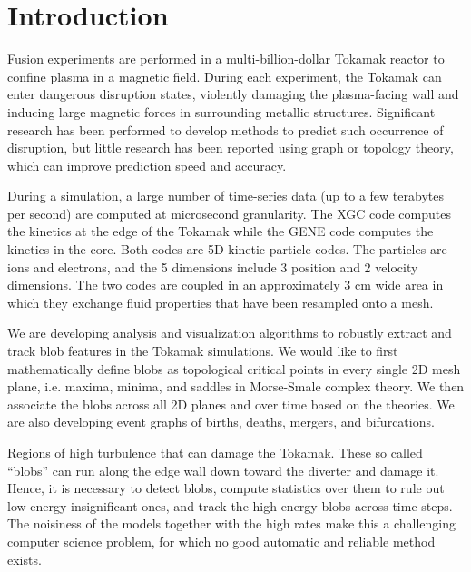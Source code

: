 \newcommand{\cA}{\mathcal{A}} %
\newcommand{\R}{\mathbb{R}} %
\newcommand{\cD}{\mathcal{D}} %
\newcommand{\cC}{\mathcal{C}} %
\newcommand{\Xs}{X^*} %
\newcommand{\cN}{\mathcal{N}} %


\section{Introduction}
\label{sec:intro}

Fusion experiments are performed in a multi-billion-dollar Tokamak reactor to confine plasma in a magnetic field. During each experiment, the Tokamak can enter dangerous disruption states, violently damaging the plasma-facing wall and inducing large magnetic forces in surrounding metallic structures. Significant research has been performed to develop methods to predict such occurrence of disruption, but little research has been reported using graph or topology theory, which can improve prediction speed and accuracy.

During a simulation, a large number of time-series data (up to a few terabytes per second) are computed at microsecond granularity. The XGC code computes the kinetics at the edge of the Tokamak while the GENE code computes the kinetics in the core. Both codes are 5D kinetic particle codes. The particles are ions and electrons, and the 5 dimensions include 3 position and 2 velocity dimensions. The two codes are coupled in an approximately 3 cm wide area in which they exchange fluid properties that have been resampled onto a mesh.

We are developing analysis and visualization algorithms to robustly extract and track blob features in the Tokamak simulations.  We would like to first mathematically define blobs as topological critical points in every single 2D mesh plane, i.e. maxima, minima, and saddles in Morse-Smale complex theory.  We then associate the blobs across all 2D planes and over time based on the theories.  We are also developing event graphs of births, deaths, mergers, and bifurcations. %

Regions of high turbulence that can damage the Tokamak.  These so called ``blobs'' can run along the edge wall down toward the diverter and damage it.  Hence, it is necessary to detect blobs, compute statistics over them to rule out low-energy insignificant ones, and track the high-energy blobs across time steps. The noisiness of the models together with the high rates make this a challenging computer science problem, for which no good automatic and reliable method exists.


